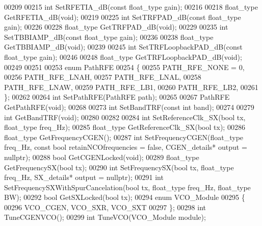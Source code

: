 \begin{DoxyCode}
00209 
00215     \textcolor{keywordtype}{int} SetRFETIA\_dB(\textcolor{keyword}{const} float\_type gain);
00216 
00218     float\_type GetRFETIA\_dB(\textcolor{keywordtype}{void});
00219 
00225     \textcolor{keywordtype}{int} SetTRFPAD\_dB(\textcolor{keyword}{const} float\_type gain);
00226 
00228     float\_type GetTRFPAD\_dB(\textcolor{keywordtype}{void});
00229     
00235     \textcolor{keywordtype}{int} SetTBBIAMP\_dB(\textcolor{keyword}{const} float\_type gain);
00236 
00238     float\_type GetTBBIAMP\_dB(\textcolor{keywordtype}{void});
00239 
00245     \textcolor{keywordtype}{int} SetTRFLoopbackPAD\_dB(\textcolor{keyword}{const} float\_type gain);
00246 
00248     float\_type GetTRFLoopbackPAD\_dB(\textcolor{keywordtype}{void});
00249 
00251 
00253     \textcolor{keyword}{enum} PathRFE
00254     \{
00255         PATH\_RFE\_NONE = 0,
00256         PATH_RFE_LNAH,
00257         PATH_RFE_LNAL,
00258         PATH_RFE_LNAW,
00259         PATH_RFE_LB1,
00260         PATH_RFE_LB2,
00261     \};
00262 
00264     \textcolor{keywordtype}{int} SetPathRFE(PathRFE path);
00265 
00267     PathRFE GetPathRFE(\textcolor{keywordtype}{void});
00268 
00273     \textcolor{keywordtype}{int} SetBandTRF(\textcolor{keyword}{const} \textcolor{keywordtype}{int} band);
00274 
00279     \textcolor{keywordtype}{int} GetBandTRF(\textcolor{keywordtype}{void});
00280 
00282 
00284     \textcolor{keywordtype}{int} SetReferenceClk\_SX(\textcolor{keywordtype}{bool} tx, float\_type freq\_Hz);
00285     float\_type GetReferenceClk\_SX(\textcolor{keywordtype}{bool} tx);
00286     float\_type GetFrequencyCGEN();
00287     \textcolor{keywordtype}{int} SetFrequencyCGEN(float\_type freq\_Hz, \textcolor{keyword}{const} \textcolor{keywordtype}{bool} retainNCOfrequencies = \textcolor{keyword}{false}, 
      CGEN_details* output = \textcolor{keyword}{nullptr});
00288     \textcolor{keywordtype}{bool} GetCGENLocked(\textcolor{keywordtype}{void});
00289     float\_type GetFrequencySX(\textcolor{keywordtype}{bool} tx);
00290     \textcolor{keywordtype}{int} SetFrequencySX(\textcolor{keywordtype}{bool} tx, float\_type freq\_Hz, SX_details* output = \textcolor{keyword}{nullptr});
00291     \textcolor{keywordtype}{int} SetFrequencySXWithSpurCancelation(\textcolor{keywordtype}{bool} tx, float\_type freq\_Hz, float\_type BW);
00292     \textcolor{keywordtype}{bool} GetSXLocked(\textcolor{keywordtype}{bool} tx);
00294     \textcolor{keyword}{enum} VCO_Module
00295     \{
00296         VCO_CGEN, VCO_SXR, VCO_SXT
00297     \};
00298     \textcolor{keywordtype}{int} TuneCGENVCO();
00299     \textcolor{keywordtype}{int} TuneVCO(VCO_Module module);

\end{DoxyCode}
